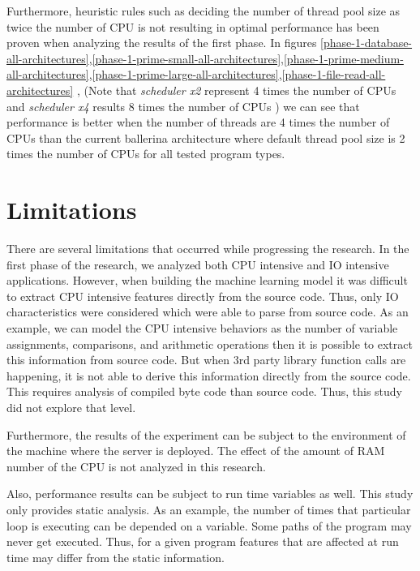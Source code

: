 Furthermore, heuristic rules such as deciding the number of thread pool size as twice the number of CPU \cite{thread_pool_analysis} is not resulting in optimal performance has been proven when analyzing the results of the first phase. In figures \ref{phase-1-database-all-architectures},\ref{phase-1-prime-small-all-architectures},\ref{phase-1-prime-medium-all-architectures},\ref{phase-1-prime-large-all-architectures},\ref{phase-1-file-read-all-architectures} , (Note that \textit{scheduler x2} represent 4 times the number of CPUs and \textit{scheduler x4} results 8 times the number of CPUs ) we can see that performance is better when the number of threads are 4 times the number of CPUs than the current ballerina architecture where default thread pool size is 2 times the number of CPUs for all tested program types. 


\section{Limitations}

There are several limitations that occurred while progressing the research. In the first phase of the research, we analyzed both CPU intensive and IO intensive applications. However, when building the machine learning model it was difficult to extract CPU intensive features directly from the source code. Thus, only IO characteristics were considered which were able to parse from source code. As an example, we can model the CPU intensive behaviors as the number of variable assignments, comparisons, and arithmetic operations then it is possible to extract this information from source code. But when 3rd party library function calls are happening, it is not able to derive this information directly from the source code. This requires analysis of compiled byte code than source code. Thus, this study did not explore that level.

Furthermore, the results of the experiment can be subject to the environment of the machine where the server is deployed. The effect of the amount of RAM number of the CPU is not analyzed in this research.

Also, performance results can be subject to run time variables as well. This study only provides static analysis. As an example, the number of times that particular loop is executing can be depended on a variable. Some paths of the program may never get executed. Thus, for a given program features that are affected at run time may differ from the static information.



